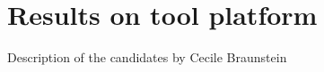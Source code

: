 
\section{Results on tool platform}

\begin{todo_comment}
Description of the candidates by Cecile Braunstein
\end{todo_comment}